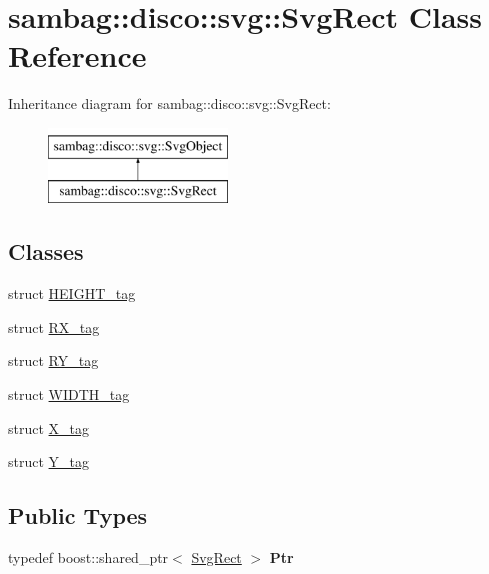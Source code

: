 \hypertarget{classsambag_1_1disco_1_1svg_1_1_svg_rect}{
\section{sambag::disco::svg::SvgRect Class Reference}
\label{classsambag_1_1disco_1_1svg_1_1_svg_rect}
}
Inheritance diagram for sambag::disco::svg::SvgRect:\begin{figure}[H]
\begin{center}
\leavevmode
\includegraphics[height=2.000000cm]{classsambag_1_1disco_1_1svg_1_1_svg_rect}
\end{center}
\end{figure}
\subsection*{Classes}
\begin{DoxyCompactItemize}
\item 
struct \hyperlink{structsambag_1_1disco_1_1svg_1_1_svg_rect_1_1_h_e_i_g_h_t__tag}{HEIGHT\_\-tag}
\item 
struct \hyperlink{structsambag_1_1disco_1_1svg_1_1_svg_rect_1_1_r_x__tag}{RX\_\-tag}
\item 
struct \hyperlink{structsambag_1_1disco_1_1svg_1_1_svg_rect_1_1_r_y__tag}{RY\_\-tag}
\item 
struct \hyperlink{structsambag_1_1disco_1_1svg_1_1_svg_rect_1_1_w_i_d_t_h__tag}{WIDTH\_\-tag}
\item 
struct \hyperlink{structsambag_1_1disco_1_1svg_1_1_svg_rect_1_1_x__tag}{X\_\-tag}
\item 
struct \hyperlink{structsambag_1_1disco_1_1svg_1_1_svg_rect_1_1_y__tag}{Y\_\-tag}
\end{DoxyCompactItemize}
\subsection*{Public Types}
\begin{DoxyCompactItemize}
\item 
\hypertarget{classsambag_1_1disco_1_1svg_1_1_svg_rect_a231b3759ec551e7a97e003fe654f76dd}{
typedef boost::shared\_\-ptr$<$ \hyperlink{classsambag_1_1disco_1_1svg_1_1_svg_rect}{SvgRect} $>$ {\bfseries Ptr}}
\label{classsambag_1_1disco_1_1svg_1_1_svg_rect_a231b3759ec551e7a97e003fe654f76dd}

\end{DoxyCompactItemize}
